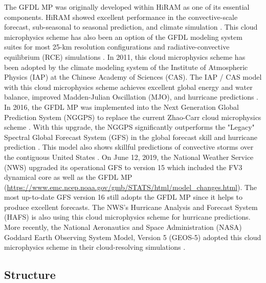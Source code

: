 \documentclass[letterpaper,titlepage,10pt]{article}
\numberwithin{equation}{section}
\begin{document}
The GFDL MP was originally developed within HiRAM as one of its essential components. HiRAM showed excellent performance in the convective-scale forecast, sub-seasonal to seasonal prediction, and climate simulation \citep{chen2011ther, chen2013seas, harris2016high, gao2017impa, gao2019impr}. This cloud microphysics scheme has also been an option of the GFDL modeling system suites for most 25-km resolution configurations and radiative-convective equilibrium (RCE) simulations \citep{jeevanjee2017vert, jeevanjee2022onth}. In 2011, this cloud microphysics scheme has been adopted by the climate modeling system of the Institute of Atmospheric Physics (IAP) at the Chinese Academy of Sciences (CAS). The IAP / CAS model with this cloud microphysics scheme achieves excellent global energy and water balance, improved Madden-Julian Oscillation (MJO), and hurricane predictions \citep{zhou2015glob, li2019eval, he2019casf}. In 2016, the GFDL MP was implemented into the Next Generation Global Prediction System (NGGPS) to replace the current Zhao-Carr cloud microphysics scheme \citep{zhao1997apro}. With this upgrade, the NGGPS significantly outperforms the "Legacy" Spectral Global Forecast System (GFS) in the global forecast skill \citep{zhou2019towa, harris2020gfdl, zhou2022impr} and hurricane prediction \citep{chen2019adva, chen2019eval}. This model also shows skillful predictions of convective storms over the contiguous United States \citep{zhou2019towa, harris2019expl}. On June 12, 2019, the National Weather Service (NWS) upgraded its operational GFS to version 15 which included the FV3 dynamical core as well as the GFDL MP (\url{https://www.emc.ncep.noaa.gov/gmb/STATS/html/model_changes.html}). The most up-to-date GFS version 16 still adopts the GFDL MP since it helps to produce excellent forecasts.  The NWS's Hurricane Analysis and Forecast System (HAFS) is also using this cloud microphysics scheme for hurricane predictions\citep{dong2020thee, hazelton2021unde}. More recently, the National Aeronautics and Space Administration (NASA) Goddard Earth Observing System Model, Version 5 (GEOS-5) adopted this cloud microphysics scheme in their cloud-resolving simulations \citep{arnold2020impa}.


\subsection{Structure}
\end{document}
